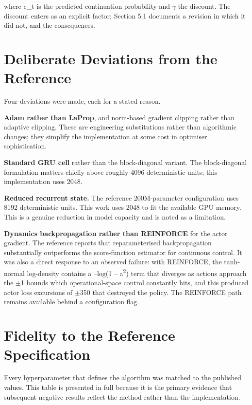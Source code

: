 \documentclass[12pt,a4paper,oneside]{report}
\begin{document}
where c\_t is the predicted continuation probability and $\gamma$ the discount.
The discount enters as an explicit factor; Section 5.1 documents a revision in
which it did not, and the consequences.

\hypertarget{deliberate-deviations-from-the-reference}{%
\section{Deliberate Deviations from the Reference}\label{deliberate-deviations-from-the-reference}}

Four deviations were made, each for a stated reason.

\textbf{Adam rather than LaProp}, and norm-based gradient clipping rather than
adaptive clipping. These are engineering substitutions rather than algorithmic
changes; they simplify the implementation at some cost in optimiser
sophistication.

\textbf{Standard GRU cell} rather than the block-diagonal variant. The
block-diagonal formulation matters chiefly above roughly 4096 deterministic
units; this implementation uses 2048.

\textbf{Reduced recurrent state.} The reference 200M-parameter configuration uses
8192 deterministic units. This work uses 2048 to fit the available GPU memory.
This is a genuine reduction in model capacity and is noted as a limitation.

\textbf{Dynamics backpropagation rather than REINFORCE} for the actor gradient. The
reference reports that reparameterised backpropagation substantially outperforms
the score-function estimator for continuous control. It was also a direct
response to an observed failure: with REINFORCE, the tanh-normal log-density
contains a --log(1 -- a\textsuperscript{2}) term that diverges as actions approach the $\pm$1
bounds which operational-space control constantly hits, and this produced actor
loss excursions of $\pm$350 that destroyed the policy. The REINFORCE path
remains available behind a configuration flag.

\hypertarget{fidelity-to-the-reference-specification}{%
\section{Fidelity to the Reference Specification}\label{fidelity-to-the-reference-specification}}

Every hyperparameter that defines the algorithm was matched to the published
values. This table is presented in full because it is the primary evidence that
subsequent negative results reflect the method rather than the implementation.
\end{document}

